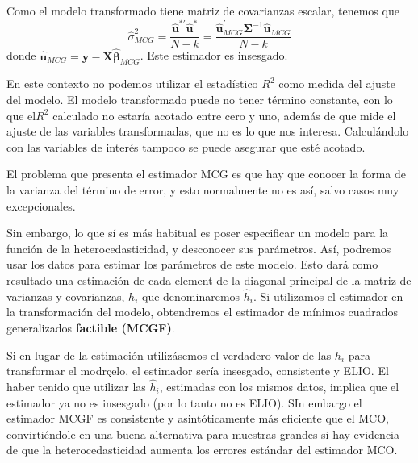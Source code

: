 
Como el modelo transformado tiene matriz de covarianzas escalar, tenemos
que 
\[
\hat{\sigma}_{MCG}^{2}=\dfrac{\hat{\boldsymbol{u}}^{*\prime}\hat{\boldsymbol{u}}^{*}}{N-k}=\dfrac{\hat{\boldsymbol{u}}_{MCG}^{\prime}\boldsymbol{\Sigma}^{-1}\hat{\boldsymbol{u}}_{MCG}}{N-k}
\]
 donde $\hat{\boldsymbol{u}}_{MCG}=\boldsymbol{y}-\boldsymbol{X}\hat{\boldsymbol{\beta}}_{MCG}$.
Este estimador es insesgado.



En este contexto no podemos utilizar el estad\'istico $R^{2}$ como
medida del ajuste del modelo. El modelo transformado puede no tener
t\'ermino constante, con lo que el$R^{2}$ calculado no estar\'ia acotado
entre cero y uno, adem\'as de que mide el ajuste de las variables transformadas,
que no es lo que nos interesa. Calcul\'andolo con las variables de inter\'es
tampoco se puede asegurar que est\'e acotado.



El problema que presenta el estimador MCG es que hay que conocer la forma de la varianza del t\'ermino de error, y esto normalmente no es as\'i, salvo casos muy excepcionales.

Sin embargo, lo que s\'i es m\'as habitual es poser especificar un modelo para la funci\'on de la heterocedasticidad, y desconocer sus par\'ametros. As\'i, podremos usar los datos para estimar los par\'ametros de este modelo. Esto dar\'a como resultado una estimaci\'on de cada element de la diagonal principal de la matriz de varianzas y covarianzas, $h_i$ que denominaremos $\hat{h}_i$. Si utilizamos el estimador en la transformaci\'on del modelo, obtendremos el estimador de m\'inimos cuadrados generalizados \textbf{factible (MCGF)}.

Si en lugar de la estimaci\'on utiliz\'asemos el verdadero valor de las $h_i$ para transformar el modrçelo, el estimador ser\'ia insesgado, consistente y ELIO. El haber tenido que utilizar las $\hat{h}_i$, estimadas con los mismos datos, implica que el estimador ya no es insesgado (por lo tanto no es ELIO). SIn embargo el estimador MCGF es consistente y asint\'oticamente m\'as eficiente que el MCO, convirti\'endole en una buena alternativa para muestras grandes si hay evidencia de que la heterocedasticidad aumenta los errores est\'andar del estimador MCO.


